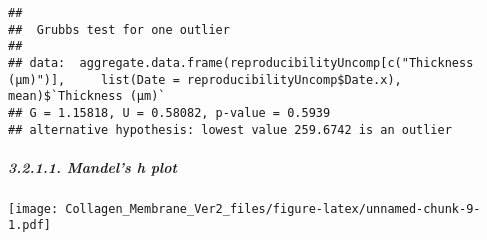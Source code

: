 \documentclass[
]{article}
\newenvironment{Shaded}{\begin{snugshade}}{\end{snugshade}}
\newcommand{\AttributeTok}[1]{\textcolor[rgb]{0.77,0.63,0.00}{#1}}
\newcommand{\DecValTok}[1]{\textcolor[rgb]{0.00,0.00,0.81}{#1}}
\newcommand{\FloatTok}[1]{\textcolor[rgb]{0.00,0.00,0.81}{#1}}
\newcommand{\FunctionTok}[1]{\textcolor[rgb]{0.00,0.00,0.00}{#1}}
\newcommand{\NormalTok}[1]{#1}
\newcommand{\OtherTok}[1]{\textcolor[rgb]{0.56,0.35,0.01}{#1}}
\newcommand{\SpecialCharTok}[1]{\textcolor[rgb]{0.00,0.00,0.00}{#1}}
\newcommand{\StringTok}[1]{\textcolor[rgb]{0.31,0.60,0.02}{#1}}
\begin{document}
\begin{Shaded}
\end{Shaded}

\begin{verbatim}
## 
##  Grubbs test for one outlier
## 
## data:  aggregate.data.frame(reproducibilityUncomp[c("Thickness (μm)")],     list(Date = reproducibilityUncomp$Date.x), mean)$`Thickness (μm)`
## G = 1.15818, U = 0.58082, p-value = 0.5939
## alternative hypothesis: lowest value 259.6742 is an outlier
\end{verbatim}

\hypertarget{mandels-h-plot}{%
\subparagraph{3.2.1.1. Mandel's h plot}\label{mandels-h-plot}}

\begin{Shaded}
\end{Shaded}

\texttt{[image: Collagen\_Membrane\_Ver2\_files/figure-latex/unnamed-chunk-9-1.pdf]}
\end{document}
